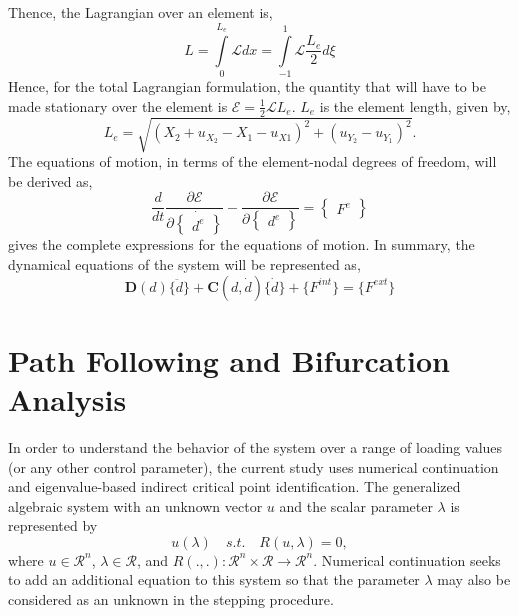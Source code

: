 \documentclass[10pt]{article}
\begin{document}
Thence, the Lagrangian over an element is,
\begin{equation}
  L = \int\limits_0^{L_e} \mathcal{L} dx = \int\limits_{-1}^{1} \mathcal{L} \frac{L_e}{2} d\xi
  \label{eq:Lagtot}
\end{equation}
Hence, for the total Lagrangian formulation, the quantity that will
have to be made stationary over the element is $\mathcal{E} =
\frac{1}{2}\mathcal{L}L_e$. $L_e$ is the element length, given by,
\begin{equation}
  L_e = \sqrt{ {(X_2+u_{X_2}-X_1-u_{X1})}^2 + {(u_{Y_2}-u_{Y_1})}^2 }.
  \label{eq:Le}  
\end{equation}
The equations of motion, in terms of the element-nodal degrees of
freedom, will be derived as,
\begin{equation}
  \frac{d}{dt}\frac{\partial \mathcal{E}}{\partial
    \dot{\begin{Bmatrix}d^e\end{Bmatrix}}} - \frac{\partial
    \mathcal{E}}{\partial \begin{Bmatrix}d^e\end{Bmatrix}}
  = \begin{Bmatrix} F^e \end{Bmatrix}
  \label{eq:femeom}
\end{equation}
 gives the complete expressions for the
equations of motion. In summary, the dynamical equations of the system
will be represented as,
\begin{equation}
  \mathbf{D}(d)\{ \ddot{d} \} + \mathbf{C}(d, \dot{d})\{ \dot{d} \} +
  \{ F^{int} \} = \{ F^{ext} \}
  \label{eq:dyneom}
\end{equation}

\section{Path Following and Bifurcation Analysis}
\label{sec:path-foll-bifurc}

In order to understand the behavior of the system over a range of
loading values (or any other control parameter), the current study
uses numerical continuation and eigenvalue-based indirect critical
point identification. The generalized algebraic system with an unknown
vector $u$ and the scalar parameter $\lambda$ is represented by
\begin{equation}
  u(\lambda)\quad s.t.\quad R(u, \lambda) = 0,
  \label{eq:genalgeq}
\end{equation}
where $u\in \mathcal{R}^n$, $\lambda\in \mathcal{R}$, and $R(., .):
\mathcal{R}^n\times \mathcal{R}\to \mathcal{R}^n$. Numerical
continuation seeks to add an additional equation to this system so
that the parameter $\lambda$ may also be considered as an unknown in
the stepping procedure.
\end{document}
